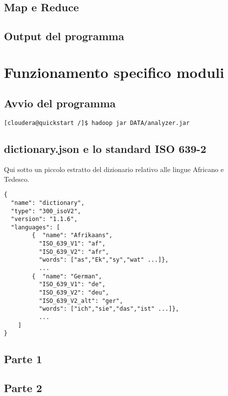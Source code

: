\documentclass{article}
\begin{document}
\subsection{Map e Reduce}

\subsection{Output del programma}

\section{Funzionamento specifico moduli}

\subsection{Avvio del programma}
\begin{verbatim}
[cloudera@quickstart /]$ hadoop jar DATA/analyzer.jar
\end{verbatim}

\subsection{dictionary.json e lo standard ISO 639-2}
Qui sotto un piccolo estratto del dizionario relativo alle lingue Africano e Tedesco.
\begin{verbatim}
{
  "name": "dictionary",
  "type": "300_isoV2",
  "version": "1.1.6",
  "languages": [
        {  "name": "Afrikaans",
          "ISO_639_V1": "af",
          "ISO_639_V2": "afr",
          "words": ["as","Ek","sy","wat" ...]}, 
          ...
        {  "name": "German",
          "ISO_639_V1": "de",
          "ISO_639_V2": "deu",
          "ISO_639_V2_alt": "ger",
          "words": ["ich","sie","das","ist" ...]}, 
          ...
    ]
}
\end{verbatim}

\subsection{Parte 1}
\subsection{Parte 2}
\end{document}
